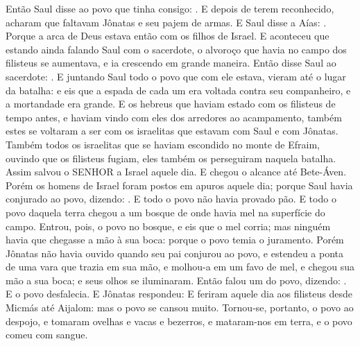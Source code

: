 {  Então Saul disse ao povo que tinha consigo: . E depois de terem reconhecido, acharam que faltavam Jônatas e seu pajem de armas.
  E Saul disse a Aías: . Porque a arca de Deus estava então com os filhos de Israel.
  E aconteceu que estando ainda falando Saul com o sacerdote, o alvoroço que havia no campo dos filisteus se aumentava, e ia crescendo em grande maneira. Então disse Saul ao sacerdote: .
  E juntando Saul todo o povo que com ele estava, vieram até o lugar da batalha: e eis que a espada de cada um era voltada contra seu companheiro, e a mortandade era grande. %
  E os hebreus que haviam estado com os filisteus de tempo antes, e haviam vindo com eles dos arredores ao acampamento, também estes se voltaram a ser com os israelitas que estavam com Saul e com Jônatas.
  Também todos os israelitas que se haviam escondido no monte de Efraim, ouvindo que os filisteus fugiam, eles também os perseguiram naquela batalha.
  Assim salvou o SENHOR a Israel aquele dia. E chegou o alcance até Bete-Áven.
  Porém os homens de Israel foram postos em apuros aquele dia; porque Saul havia conjurado ao povo, dizendo: . E todo o povo não havia provado pão.
  E todo o povo daquela terra chegou a um bosque de onde havia mel na superfície do campo.
  Entrou, pois, o povo no bosque, e eis que o mel corria; mas ninguém havia que chegasse a mão à sua boca: porque o povo temia o juramento.
  Porém Jônatas não havia ouvido quando seu pai conjurou ao povo, e estendeu a ponta de uma vara que trazia em sua mão, e molhou-a em um favo de mel, e chegou sua mão a sua boca; e seus olhos se iluminaram.
  Então falou um do povo, dizendo: . E o povo desfalecia.
  E Jônatas respondeu: 
  E feriram aquele dia aos filisteus desde Micmás até Aijalom: mas o povo se cansou muito.
  Tornou-se, portanto, o povo ao despojo, e tomaram ovelhas e vacas e bezerros, e mataram-nos em terra, e o povo comeu com sangue.
}
